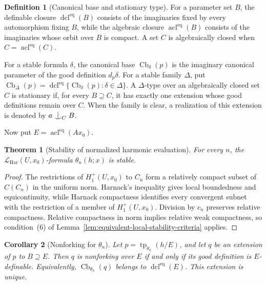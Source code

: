 \documentclass{amsart}
\newtheorem{theorem}{Theorem}[section]
\newtheorem{corollary}[theorem]{Corollary}
\theoremstyle{definition}
\newtheorem{definition}{Definition}[section]
\theoremstyle{remark}
\newcommand{\forkindep}[1][]{%
	\mathrel{
		\mathop{
			\vcenter{
				\hbox{\oalign{\noalign{\kern-.3ex}\hfil$\vert$\hfil\cr
						\noalign{\kern-.7ex}
						$\smile$\cr\noalign{\kern-.3ex}}}
			}
		}\displaylimits_{#1}
	}
}
\numberwithin{equation}{section}
\begin{document}
\begin{definition}[Canonical base and stationary type]
For a parameter set $B$, the definable closure
$\operatorname{dcl}^{\mathrm{eq}}(B)$ consists of the imaginaries
fixed by every automorphism fixing $B$, while the algebraic closure
$\operatorname{acl}^{\mathrm{eq}}(B)$ consists of the imaginaries
whose orbit over $B$ is compact. A set $C$ is algebraically closed
when $C=\operatorname{acl}^{\mathrm{eq}}(C)$.

For a stable formula $\delta$, the canonical base
$\operatorname{Cb}_\delta(p)$ is the imaginary canonical parameter
of the good definition $d_p\delta$. For a stable family $\Delta$,
put
$\operatorname{Cb}_\Delta(p)=
\operatorname{dcl}^{\mathrm{eq}}
\{\operatorname{Cb}_\delta(p):\delta\in\Delta\}$.
A $\Delta$-type over an algebraically closed set $C$ is stationary
if, for every $B\supseteq C$, it has exactly one extension whose good
definitions remain over $C$. When the family is clear, a realization
of this extension is denoted by $a\forkindep[C]B$.
\end{definition}

Now put $E=\operatorname{acl}^{\mathrm{eq}}(Ax_0)$.

\begin{theorem}[Stability of normalized harmonic evaluation]
\label{thm:theta-n-stable}
For every $n$, the $\mathcal L_{\mathrm{Har}}(U,x_0)$-formula $\theta_n(h;x)$ is stable.
\end{theorem}

\begin{proof}
The restrictions of $H_1^+(U,x_0)$ to $C_n$ form a relatively
compact subset of $C(C_n)$ in the uniform norm. Harnack's inequality
gives local boundedness and equicontinuity, while Harnack compactness
identifies every convergent subnet with the restriction of a member
of $H_1^+(U,x_0)$. Division by $c_n$ preserves relative
compactness. Relative compactness in norm implies relative weak
compactness, so condition~(6) of
Lemma~\ref{lem:equivalent-local-stability-criteria} applies.
\end{proof}

\begin{corollary}[Nonforking for $\theta_n$]
\label{cor:theta-n-nonforking}
Let $p=\operatorname{tp}_{\theta_n}(h/E)$, and let $q$ be an
extension of $p$ to $B\supseteq E$. Then $q$ is nonforking over $E$
if and only if its good definition is $E$-definable. Equivalently,
$\operatorname{Cb}_{\theta_n}(q)$ belongs to
$\operatorname{dcl}^{\mathrm{eq}}(E)$. This extension is unique.
\end{corollary}
\end{document}
